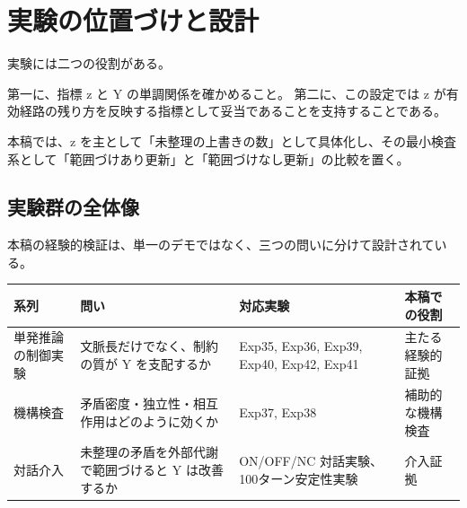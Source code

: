 \documentclass[12pt,a4paper]{article}
\begin{document}
\section{実験の位置づけと設計}\label{ux5b9fux9a13ux306eux4f4dux7f6eux3065ux3051ux3068ux8a2dux8a08}

実験には二つの役割がある。

第一に、指標 z と Y の単調関係を確かめること。 第二に、この設定では z が有効経路の残り方を反映する指標として妥当であることを支持することである。

本稿では、z を主として「未整理の上書きの数」として具体化し、その最小検査系として「範囲づけあり更新」と「範囲づけなし更新」の比較を置く。

\subsection{実験群の全体像}\label{ux5b9fux9a13ux7fa4ux306eux5168ux4f53ux50cf}

本稿の経験的検証は、単一のデモではなく、三つの問いに分けて設計されている。

{\def\LTcaptype{table} %
\begin{longtable}[]{@{}
  >{\raggedright\arraybackslash}p{}
  >{\raggedright\arraybackslash}p{}
  >{\raggedright\arraybackslash}p{}
  >{\raggedright\arraybackslash}p{}@{}}
\toprule\noalign{}
\begin{minipage}[b]{\linewidth}\raggedright
系列
\end{minipage} & \begin{minipage}[b]{\linewidth}\raggedright
問い
\end{minipage} & \begin{minipage}[b]{\linewidth}\raggedright
対応実験
\end{minipage} & \begin{minipage}[b]{\linewidth}\raggedright
本稿での役割
\end{minipage} \\
\midrule\noalign{}
\endhead
\bottomrule\noalign{}
\endlastfoot
単発推論の制御実験 & 文脈長だけでなく、制約の質が Y を支配するか & Exp35, Exp36, Exp39, Exp40, Exp42, Exp41 & 主たる経験的証拠 \\
機構検査 & 矛盾密度・独立性・相互作用はどのように効くか & Exp37, Exp38 & 補助的な機構検査 \\
対話介入 & 未整理の矛盾を外部代謝で範囲づけると Y は改善するか & ON/OFF/NC 対話実験、100ターン安定性実験 & 介入証拠 \\
\end{longtable}
}
\end{document}

